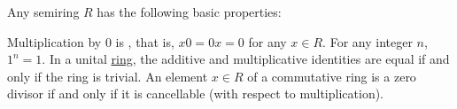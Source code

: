 \begin{proposition}\label{thm:semiring_properties}
  Any semiring \( R \) has the following basic properties:
  \begin{thmenum}
     Multiplication by \( 0 \) is , that is, \( x0 = 0x = 0 \) for any \( x \in R \).
     For any integer \( n \), \( 1^n = 1 \).
     In a unital \hyperref[def:semiring/unital_ring]{ring}, the additive and multiplicative identities are equal if and only if the ring is trivial.
     An element \( x \in R \) of a commutative ring is a zero divisor if and only if it is cancellable (with respect to multiplication).
  \end{thmenum}
\end{proposition}
